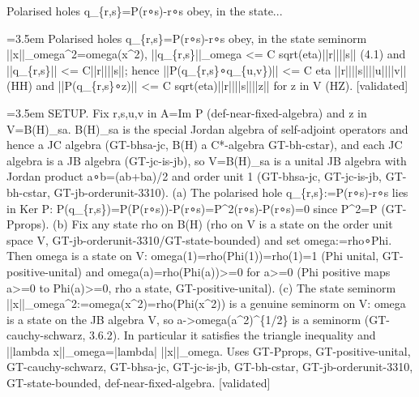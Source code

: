 \documentclass{article}
\newcommand{\step}[1]{\par\noindent\hangindent=3.5em\hangafter=1%
  \makebox[3.5em][l]{\textbf{#1.}}}
\newcommand{\steptag}[1]{\hfill{\small\textsf{[#1]}}}
\begin{document}
\begin{proofbox}{Polarised holes q\_\{r,s\}=P(r∘s)-r∘s obey, in the state...}
\step{1} Polarised holes q\_\{r,s\}=P(r∘s)-r∘s obey, in the state seminorm ||x||\_omega\textasciicircum{}2=omega(x\textasciicircum{}2), ||q\_\{r,s\}||\_omega <= C sqrt(eta)||r||||s|| (4.1) and ||q\_\{r,s\}|| <= C||r||||s||; hence ||P(q\_\{r,s\}∘q\_\{u,v\})|| <= C eta ||r||||s||||u||||v|| (HH) and ||P(q\_\{r,s\}∘z)|| <= C sqrt(eta)||r||||s||||z|| for z in V (HZ). \steptag{validated} \\[6pt]
\step{1.1} SETUP. Fix r,s,u,v in A=Im P (def-near-fixed-algebra) and z in V=B(H)\_sa. B(H)\_sa is the special Jordan algebra of self-adjoint operators and hence a JC algebra (GT-bhsa-jc, B(H) a C*-algebra GT-bh-cstar), and each JC algebra is a JB algebra (GT-jc-is-jb), so V=B(H)\_sa is a unital JB algebra with Jordan product a∘b=(ab+ba)/2 and order unit 1 (GT-bhsa-jc, GT-jc-is-jb, GT-bh-cstar, GT-jb-orderunit-3310). (a) The polarised hole q\_\{r,s\}:=P(r∘s)-r∘s lies in Ker P: P(q\_\{r,s\})=P(P(r∘s))-P(r∘s)=P\textasciicircum{}2(r∘s)-P(r∘s)=0 since P\textasciicircum{}2=P (GT-Pprops). (b) Fix any state rho on B(H) (rho on V is a state on the order unit space V, GT-jb-orderunit-3310/GT-state-bounded) and set omega:=rho∘Phi. Then omega is a state on V: omega(1)=rho(Phi(1))=rho(1)=1 (Phi unital, GT-positive-unital) and omega(a)=rho(Phi(a))>=0 for a>=0 (Phi positive maps a>=0 to Phi(a)>=0, rho a state, GT-positive-unital). (c) The state seminorm ||x||\_omega\textasciicircum{}2:=omega(x\textasciicircum{}2)=rho(Phi(x\textasciicircum{}2)) is a genuine seminorm on V: omega is a state on the JB algebra V, so a->omega(a\textasciicircum{}2)\textasciicircum{}\{1/2\} is a seminorm (GT-cauchy-schwarz, 3.6.2). In particular it satisfies the triangle inequality and ||lambda x||\_omega=|lambda| ||x||\_omega. Uses GT-Pprops, GT-positive-unital, GT-cauchy-schwarz, GT-bhsa-jc, GT-jc-is-jb, GT-bh-cstar, GT-jb-orderunit-3310, GT-state-bounded, def-near-fixed-algebra. \steptag{validated} \\[4pt]

\end{proofbox}
\end{document}
